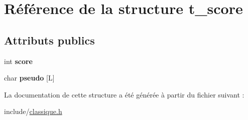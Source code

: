 \hypertarget{structt__score}{}\section{Référence de la structure t\+\_\+score}
\label{structt__score}
\subsection*{Attributs publics}
\begin{DoxyCompactItemize}
\item 
int {\bfseries score}\hypertarget{structt__score_a342cf1aaec29772e5e56d29837395434}{}\label{structt__score_a342cf1aaec29772e5e56d29837395434}

\item 
char {\bfseries pseudo} \mbox{[}L\mbox{]}\hypertarget{structt__score_afb0c7de99354ee59fd389d50e9a921b3}{}\label{structt__score_afb0c7de99354ee59fd389d50e9a921b3}

\end{DoxyCompactItemize}


La documentation de cette structure a été générée à partir du fichier suivant \+:\begin{DoxyCompactItemize}
\item 
include/\hyperlink{classique_8h}{classique.\+h}\end{DoxyCompactItemize}
